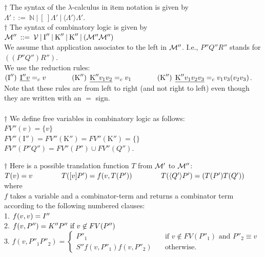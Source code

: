 \documentclass[11pt]{article}
\begin{document}
$\dagger$ The syntax of the $\lambda$-calculus in item notation is given by\\
$\Lambda'  \: ::=  \:  {\mathbb{N}} \:|\: [\:]{\Lambda'} \:|\: \langle \Lambda' \rangle \Lambda'$.\\

$\dagger$ The syntax of combinatory logic is given by\\
${\cal M}''  \: ::=  \:  {\cal V} \:|\: \mbox{I}'' \:|\: \mbox{K}'' \:|\:\mbox{K}''\:|\: ({\cal M}''{\cal M}'')$\\
We assume that application associates to the left in ${\cal M}''$. I.e., $P''Q''R''$ stands for $((P''Q'')R'')$.\\
We use  the reduction rules: \\
$(\mbox{I}'') \: \:  \underline{\mbox{I}'' v} =_c v \hspace{0.5in} (\mbox{K}'') \: \:  \underline{\mbox{K}'' v_1v_2} =_c v_1 \hspace{0.5in} (\mbox{K}'') \:\:   \underline{\mbox{K}'' v_1v_2v_3} =_c v_1v_3(v_2v_3)$.\\
Note that these rules are from left to right (and not right to left) even though they are written with an $=$ sign.\\
\\
$\dagger$ 
We define free variables in combinatory logic as follows:\\
$FV''(v) = \{v\}$\\
$FV''(\mbox{I}'') = FV''(\mbox{K}'') = FV''(\mbox{K}'') = \{\}$\\ $FV''(P''Q'') = FV''(P'')\cup FV''(Q'')$.

$\dagger$ Here is a possible translation function $T$ from ${\cal M}'$ to ${\cal M}''$:\\
$T(v) = v      \hspace{0.5in} \: \: T([v]P') = f(v, T(P'))  \: \: \hspace{0.5in}  T(\langle Q' \rangle P') = (T(P')T(Q'))$ where\\
$f$ takes a variable and a combinator-term and returns a combinator term according to the following numbered clauses:\\
1. $f(v,v) = I''   \hspace{0.5in}   \: \:$\\  2. $f(v,P'')=  K''P''  \mbox{  if $v \not \in FV(P'')$}   \: \:  \hspace{0.5in} $\\
3. $f(v,P''_1P''_2)=  \begin{cases}
P''_1 &\quad\mbox{if $v \not \in FV(P''_1)$ and $P''_2 \equiv v$}\\
S''f(v,P''_1)f(v,P''_2) & \quad\mbox{otherwise.} 
\end{cases}$
\end{document}

